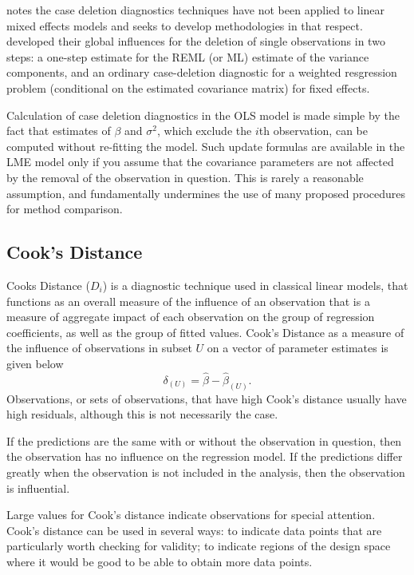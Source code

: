 \documentclass[12pt, a4paper]{report}
\theoremstyle{definition}
\theoremstyle{remark}
\begin{document}
\citet{Christensen} notes the case deletion diagnostics techniques have not been applied to linear mixed effects models and seeks to develop methodologies in that respect. \citet{Christensen} developed their global influences for the deletion of single observations in two steps: a one-step estimate for the REML (or ML) estimate of the variance components, and an ordinary case-deletion diagnostic for a weighted resgression problem (conditional on the estimated covariance matrix) for fixed effects.


Calculation of case deletion diagnostics in the OLS model is made simple by the fact that estimates of $\beta$ and $\sigma^2$, which exclude the $i$th observation, can be computed without re-fitting the model. Such update formulas are available in the LME model only if you assume that the covariance parameters are not affected by the removal of the observation in question. This is rarely a reasonable assumption, and fundamentally undermines the use of many proposed procedures for method comparison.



\subsection{Cook's Distance}

 Cooks Distance ($D_{i}$) is a diagnostic technique used in classical linear models, that functions as an overall measure of the influence of an observation that is a measure of aggregate impact of each observation on the group of regression coefficients, as well as the group of fitted values.  Cook's Distance as a measure of the influence of observations in subset $U$ on a vector of parameter estimates is given below \citep{cook77}
\[ \delta_{(U)} = \hat{\beta} - \hat{\beta}_{(U)}.\]
Observations, or sets of observations, that have high Cook's distance usually have high residuals, although this is not necessarily the case.


If the predictions are the same with or without the observation in question, then the observation has no influence on the regression model. If the predictions differ greatly when the observation is not included in the analysis, then the observation is influential.

Large values for Cook's distance indicate observations for special attention. Cook's distance can be used in several ways: to indicate data points that are particularly worth checking for validity; to indicate regions of the design space where it would be good to be able to obtain more data points.
\end{document}
